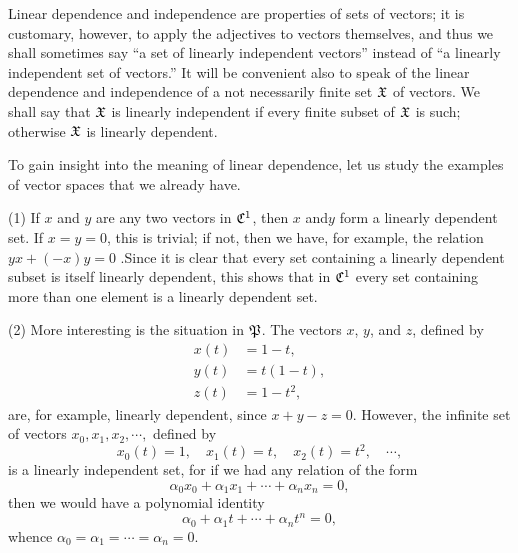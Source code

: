 Linear dependence and independence are properties of sets of vectors; it is
customary, however, to apply the adjectives to vectors themselves, and thus we
shall sometimes say ``a set of linearly independent vectors'' instead of ``a
linearly independent set of vectors.'' It will be convenient also to speak of
the linear dependence and independence of a not necessarily finite set
\(\frak{X}\) of vectors. We shall say that \(\frak{X}\) is linearly
independent if every finite subset of \(\frak{X}\) is such; otherwise
\(\frak{X}\) is linearly dependent.

To gain insight into the meaning of linear dependence, let us study the examples
of vector spaces that we already have.

(1) If \(x\) and \(y\) are any two vectors in \(\frak{C}^1\), then \(x\)
and\(y\) form a linearly dependent set. If \(x =y = 0\), this is trivial; if
not, then we have, for example, the relation \(yx + (-x)y = 0\) .Since it is
clear that every set containing a linearly dependent subset is itself linearly
dependent, this shows that in \(\frak{C}^1\) every set containing more than
one element is a linearly dependent set.

(2) More interesting is the situation in \(\frak{P}\). The vectors \(x\),
\(y\), and \(z\), defined by
\begin{align*}
    x(t) &= 1-t,\\
    y(t) &= t(1-t),\\
    z(t) &= 1-t^2,
\end{align*}
are, for example, linearly dependent, since \(x + y - z = 0\). However, the
infinite set of vectors \(x_0, x_1, x_2, \cdots,\) defined by
\begin{equation*}
    x_0(t) = 1, \quad x_1(t) = t, \quad x_2(t) = t^2, \quad \cdots,
\end{equation*}
is a linearly independent set, for if we had any relation of the form
\begin{equation*}
    \alpha_0 x_0 + \alpha_1 x_1 +  \cdots + \alpha_n x_n = 0,
\end{equation*}
then we would have a polynomial identity
\begin{equation*}
    \alpha_0 + \alpha_1 t +  \cdots + \alpha_n t^n = 0,
\end{equation*}
whence \(\alpha_0 = \alpha_1 = \cdots = \alpha_n = 0\).

